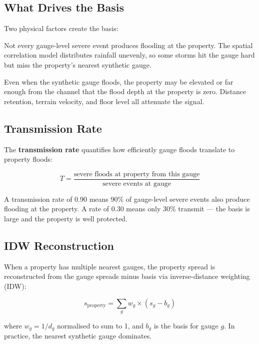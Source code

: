 \documentclass[11pt,a4paper]{article}
\begin{document}
\subsection{What Drives the Basis}

Two physical factors create the basis:

\begin{description}[leftmargin=2em]
  \item[Spatial Heterogeneity Effect (SHE)] Not every gauge-level
        severe event produces flooding at the property.  The spatial
        correlation model distributes rainfall unevenly, so some storms
        hit the gauge hard but miss the property's nearest synthetic
        gauge.
  \item[Surface Height Distance Effect (SHD)] Even when the synthetic
        gauge floods, the property may be elevated or far enough from
        the channel that the flood depth at the property is zero.
        Distance retention, terrain velocity, and floor level all
        attenuate the signal.
\end{description}

\subsection{Transmission Rate}

The \textbf{transmission rate} quantifies how efficiently gauge floods
translate to property floods:

\[
  T = \frac{\text{severe floods at property from this gauge}}
           {\text{severe events at gauge}}
\]

\noindent A transmission rate of 0.90 means 90\% of gauge-level severe
events also produce flooding at the property.  A rate of 0.30 means
only 30\% transmit --- the basis is large and the property is well
protected.

\subsection{IDW Reconstruction}

When a property has multiple nearest gauges, the property spread is
reconstructed from the gauge spreads minus basis via inverse-distance
weighting (IDW):

\[
  s_{\mathrm{property}} = \sum_{g} w_g \times (s_g - b_g)
\]

\noindent where $w_g = 1/d_g$ normalised to sum to 1, and $b_g$ is the
basis for gauge $g$.  In practice, the nearest synthetic gauge dominates.
\end{document}
